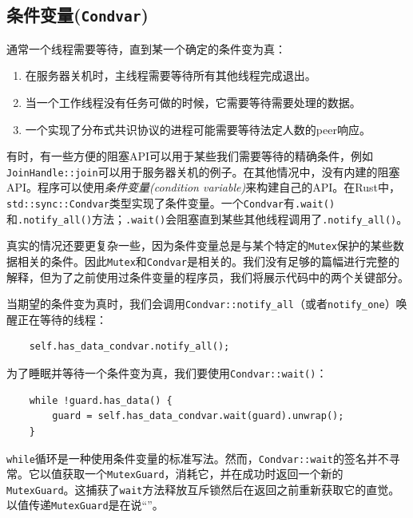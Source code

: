 \subsection{条件变量(\texttt{Condvar})}
通常一个线程需要等待，直到某一个确定的条件变为真：
\begin{enumerate}
    \item 在服务器关机时，主线程需要等待所有其他线程完成退出。
    \item 当一个工作线程没有任务可做的时候，它需要等待需要处理的数据。
    \item 一个实现了分布式共识协议的进程可能需要等待法定人数的peer响应。
\end{enumerate}

有时，有一些方便的阻塞API可以用于某些我们需要等待的精确条件，例如\texttt{JoinHandle::join}可以用于服务器关机的例子。在其他情况中，没有内建的阻塞API。程序可以使用\emph{条件变量(condition variable)}来构建自己的API。在Rust中，\texttt{std::sync::Condvar}类型实现了条件变量。一个\texttt{Condvar}有\texttt{.wait()}和\texttt{.notify\_all()}方法；\texttt{.wait()}会阻塞直到某些其他线程调用了\texttt{.notify\_all()}。

真实的情况还要更复杂一些，因为条件变量总是与某个特定的\texttt{Mutex}保护的某些数据相关的条件。因此\texttt{Mutex}和\texttt{Condvar}是相关的。我们没有足够的篇幅进行完整的解释，但为了之前使用过条件变量的程序员，我们将展示代码中的两个关键部分。

当期望的条件变为真时，我们会调用\texttt{Condvar::notify\_all}（或者\texttt{notify\_one}）唤醒正在等待的线程：
\begin{verbatim}
    self.has_data_condvar.notify_all();
\end{verbatim}

为了睡眠并等待一个条件变为真，我们要使用\texttt{Condvar::wait()}：
\begin{verbatim}
    while !guard.has_data() {
        guard = self.has_data_condvar.wait(guard).unwrap();
    }
\end{verbatim}

\texttt{while}循环是一种使用条件变量的标准写法。然而，\texttt{Condvar::wait}的签名并不寻常。它以值获取一个\texttt{MutexGuard}，消耗它，并在成功时返回一个新的\texttt{MutexGuard}。这捕获了\texttt{wait}方法释放互斥锁然后在返回之前重新获取它的直觉。以值传递\texttt{MutexGuard}是在说“”。

